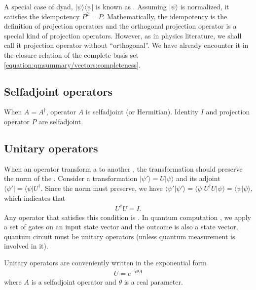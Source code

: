 \documentclass[letterpaper,10pt,english]{jupyterBook}
\begin{document}
\sphinxAtStartPar
A special case of dyad, \(|\psi\rangle\langle\psi|\) is known as .  Assuming \(|\psi\rangle\) is normalized, it satisfies the idempotency \(P^2=P\). Mathematically, the idempotency is the definition of projection operators and the orthogonal projection operator is a special kind of projection operators. However, as in physics literature, we shall call it projection operator without “orthogonal”.  We have already encounter it in the closure relation of the complete basis set \eqref{equation:qmsummary/vectors:completeness}.


\subsection{Self\sphinxhyphen{}adjoint operators}
\label{\detokenize{qmsummary/operators:self-adjoint-operators}}
\sphinxAtStartPar
When \(A = A^\dagger\), operator \(A\) is self\sphinxhyphen{}adjoint (or Hermitian).  Identity \(I\) and projection operator \(P\) are self\sphinxhyphen{}adjoint.


\subsection{Unitary operators}
\label{\detokenize{qmsummary/operators:unitary-operators}}
\sphinxAtStartPar
When an operator transform a  to another , the transformation should preserve the norm of the .  Consider a transformation \(|\psi'\rangle = U |\psi\rangle\) and its adjoint \( \langle\psi'| = \langle\psi| U^\dagger\).  Since the norm must preserve, we have
\(\langle \psi'|\psi' \rangle =  \langle\psi| U^\dagger U |\psi\rangle = \langle \psi|\psi \rangle\), which indicates that
\begin{equation*}
\begin{split}
U^\dagger U = I.
\end{split}
\end{equation*}
\sphinxAtStartPar
Any operator that satisfies this condition is . In quantum computation , we apply a set of gates on an input state vector and the outcome is also a state vector, quantum circuit must be unitary operators (unless quantum measurement is involved in it).

\sphinxAtStartPar
Unitary operators are conveniently written in the exponential form
\begin{equation*}
\begin{split}
U = e^{-i \theta A}
\end{split}
\end{equation*}
\sphinxAtStartPar
where \(A\) is a self\sphinxhyphen{}adjoint operator and \(\theta\) is a real parameter.
\end{document}
